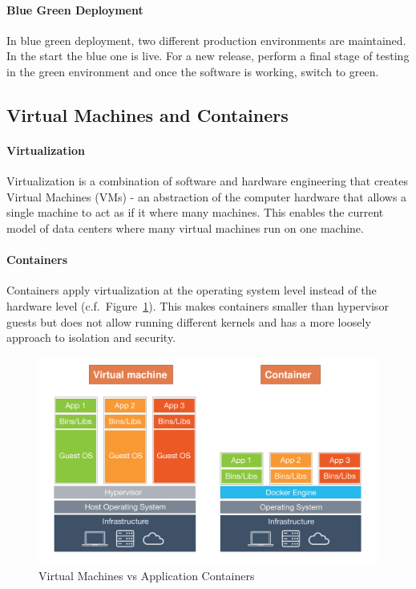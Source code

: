 \paragraph{Blue Green Deployment}
In blue green deployment, two different production environments are maintained.
In the start the blue one is live.
For a new release, perform a final stage of testing in the green environment and once the software is working, switch to green.

\subsection{Virtual Machines and Containers}
\paragraph{Virtualization}
Virtualization is a combination of software and hardware engineering that creates Virtual Machines (VMs) - an abstraction of the computer hardware that allows a single machine to act as if it where many machines.
This enables the current model of data centers where many virtual machines run on one machine.

\paragraph{Containers}
Containers apply virtualization at the operating system level instead of the hardware level (c.f.\ Figure~\ref{fig:container_vs_virtual_machines}).
This makes containers smaller than hypervisor guests but does not allow running different kernels and has a more loosely approach to isolation and security.\\
\begin{figure}[h]
  \centering
  \includegraphics[width=.8\textwidth]{images/container_vs_virtual_machines.png}
  \caption{Virtual Machines vs Application Containers}\label{fig:container_vs_virtual_machines}
\end{figure}

